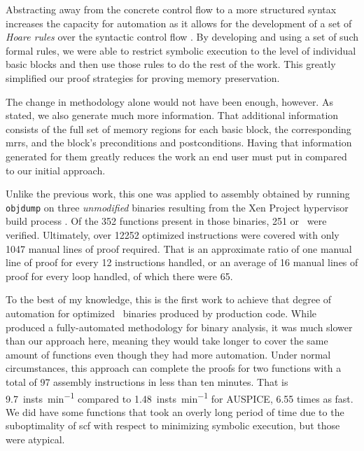Abstracting away from the concrete control flow to a more structured syntax
increases the capacity for automation
as it allows for the development of a set of \emph{Hoare rules}
over the syntactic control flow \autocite{hoare1969axiomatic}.
By developing and using a set of such formal rules, we were able to restrict symbolic execution
to the level of individual basic blocks and then use those rules to do the rest of the work.
This greatly simplified our proof strategies for proving memory preservation.

The change in methodology alone would not have been enough, however.
As stated, we also generate much more information.
That additional information consists of the full set of memory regions
for each basic block, the corresponding \acp{mrr},
and the block's preconditions and postconditions.
Having that information generated for them greatly reduces the work an end user
must put in compared to our initial approach.

Unlike the previous work, this one was applied to assembly obtained
by running \texttt{objdump} on three \emph{unmodified} binaries resulting from the
Xen Project hypervisor build process \autocite{chisnall2008definitive}.
Of the \num{352} functions present in those binaries,
\num{251} or \xenpercentage\ were verified.
Ultimately, over \num{12252} optimized instructions were covered
with only \num{1047} manual lines of proof required.
That is an approximate ratio of one manual line of proof
for every \num{12} instructions handled,
or an average of \num{16} manual lines of proof for every loop handled,
of which there were \num{65}.

To the best of my knowledge, this is the first work to achieve
that degree of automation for optimized \arch\ binaries produced by production code.
While \textcite{tan2015auspice} produced a fully-automated methodology
for binary analysis, it was much slower than our approach here,
meaning they would take longer to cover the same amount of functions
even though they had more automation.
Under normal circumstances, this approach can complete the proofs for two functions
with a total of \num{97} assembly instructions in less than ten minutes.
That is \SI{9.7}{insts\per\minute} compared to \SI{1.48}{insts\per\minute}
for AUSPICE, \num{6.55} times as fast. We did have some functions that took
an overly long period of time due to the suboptimality of \acl{scf}
with respect to minimizing symbolic execution, but those were atypical.

